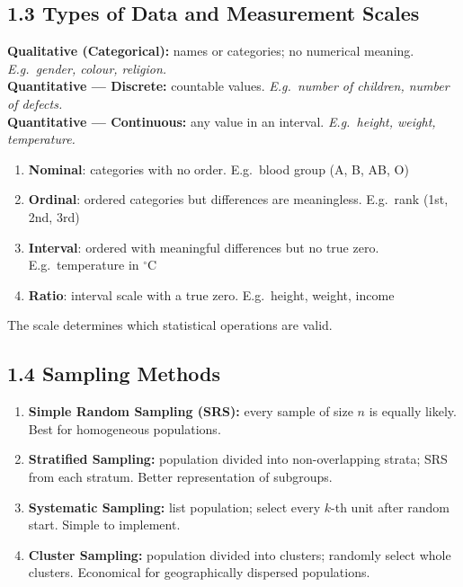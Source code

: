 \documentclass[12pt]{article}
\begin{document}
\subsection{1.3 Types of Data and Measurement Scales}

\begin{defbox}
\textbf{Qualitative (Categorical):} names or categories; no numerical meaning. \textit{E.g.\ gender, colour, religion.}\\[4pt]
\textbf{Quantitative --- Discrete:} countable values. \textit{E.g.\ number of children, number of defects.}\\[4pt]
\textbf{Quantitative --- Continuous:} any value in an interval. \textit{E.g.\ height, weight, temperature.}
\end{defbox}

\begin{defbox}
\begin{enumerate}[noitemsep,label=\textbf{\arabic*.}]
  \item \textbf{Nominal}: categories with no order. E.g.\ blood group (A, B, AB, O)
  \item \textbf{Ordinal}: ordered categories but differences are meaningless. E.g.\ rank (1st, 2nd, 3rd)
  \item \textbf{Interval}: ordered with meaningful differences but no true zero. E.g.\ temperature in $^\circ$C
  \item \textbf{Ratio}: interval scale with a true zero. E.g.\ height, weight, income
\end{enumerate}
The scale determines which statistical operations are valid.
\end{defbox}

\subsection{1.4 Sampling Methods}

\begin{defbox}
\begin{enumerate}[noitemsep,label=\textbf{\arabic*.}]
  \item \textbf{Simple Random Sampling (SRS):} every sample of size $n$ is equally likely. Best for homogeneous populations.
  \item \textbf{Stratified Sampling:} population divided into non-overlapping strata; SRS from each stratum. Better representation of subgroups.
  \item \textbf{Systematic Sampling:} list population; select every $k$-th unit after random start. Simple to implement.
  \item \textbf{Cluster Sampling:} population divided into clusters; randomly select whole clusters. Economical for geographically dispersed populations.
\end{enumerate}
\end{defbox}
\end{document}
